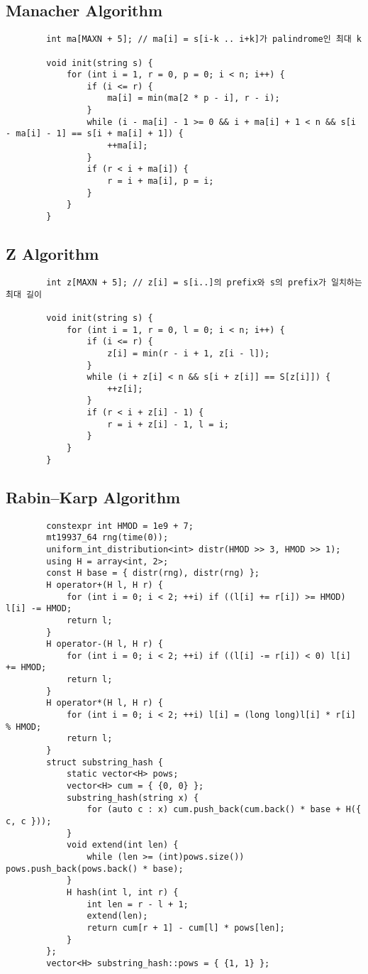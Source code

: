 \documentclass[landscape, 8pt, a4paper, oneside, twocolumn]{extarticle}
\begin{document}
	\subsection{Manacher Algorithm}
	\begin{verbatim}
		int ma[MAXN + 5]; // ma[i] = s[i-k .. i+k]가 palindrome인 최대 k
		
		void init(string s) {
			for (int i = 1, r = 0, p = 0; i < n; i++) {
				if (i <= r) {
					ma[i] = min(ma[2 * p - i], r - i);
				}
				while (i - ma[i] - 1 >= 0 && i + ma[i] + 1 < n && s[i - ma[i] - 1] == s[i + ma[i] + 1]) {
					++ma[i];
				}
				if (r < i + ma[i]) {
					r = i + ma[i], p = i;
				}
			}
		}
	\end{verbatim}
	\subsection{Z Algorithm}
	\begin{verbatim}
		int z[MAXN + 5]; // z[i] = s[i..]의 prefix와 s의 prefix가 일치하는 최대 길이
		
		void init(string s) {
			for (int i = 1, r = 0, l = 0; i < n; i++) {
				if (i <= r) {
					z[i] = min(r - i + 1, z[i - l]);
				}
				while (i + z[i] < n && s[i + z[i]] == S[z[i]]) {
					++z[i];
				}
				if (r < i + z[i] - 1) {
					r = i + z[i] - 1, l = i;
				}
			}
		}
	\end{verbatim}
	\subsection{Rabin–Karp Algorithm}
	\begin{verbatim}
		constexpr int HMOD = 1e9 + 7;
		mt19937_64 rng(time(0));
		uniform_int_distribution<int> distr(HMOD >> 3, HMOD >> 1);
		using H = array<int, 2>;
		const H base = { distr(rng), distr(rng) };
		H operator+(H l, H r) {
			for (int i = 0; i < 2; ++i) if ((l[i] += r[i]) >= HMOD) l[i] -= HMOD;
			return l;
		}
		H operator-(H l, H r) {
			for (int i = 0; i < 2; ++i) if ((l[i] -= r[i]) < 0) l[i] += HMOD;
			return l;
		}
		H operator*(H l, H r) {
			for (int i = 0; i < 2; ++i) l[i] = (long long)l[i] * r[i] % HMOD;
			return l;
		}
		struct substring_hash {
			static vector<H> pows;
			vector<H> cum = { {0, 0} };
			substring_hash(string x) {
				for (auto c : x) cum.push_back(cum.back() * base + H({ c, c }));
			}
			void extend(int len) {
				while (len >= (int)pows.size()) pows.push_back(pows.back() * base);
			}
			H hash(int l, int r) {
				int len = r - l + 1;
				extend(len);
				return cum[r + 1] - cum[l] * pows[len];
			}
		};
		vector<H> substring_hash::pows = { {1, 1} };
	\end{verbatim}
\end{document}
